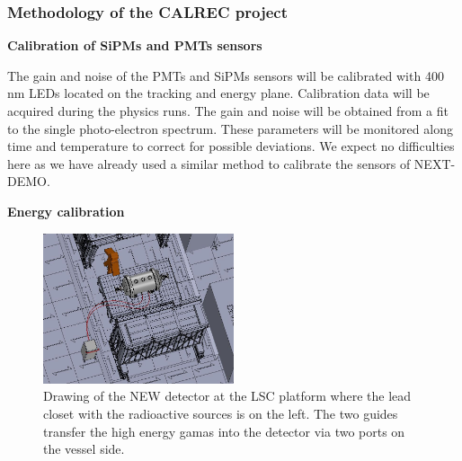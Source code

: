 
\subsubsection*{Methodology of the CALREC project}

%

{\bf Calibration of SiPMs and PMTs sensors}

The gain and noise of the PMTs and SiPMs sensors will be calibrated with 400 nm LEDs located on the tracking and energy plane. 
Calibration data will be acquired during the physics runs.
The gain and noise will be obtained from a fit to the single photo-electron spectrum.
These parameters will be monitored along time and temperature to correct for possible deviations. 
We expect no difficulties here as we have already used a similar method to calibrate the sensors of NEXT-DEMO.

{\bf Energy calibration}

\begin{figure}
\begin{center}
\includegraphics[width=0.5\textwidth]{img/CALREC_LSC_sources.jpg}
\caption{\small Drawing of the NEW detector at the LSC platform where the lead closet with the radioactive sources is on the left. The two guides transfer the high energy gamas into the detector via two ports on the vessel side.}
\label{fig:CALREC_LSC_sources}
\end{center}
\end{figure}

